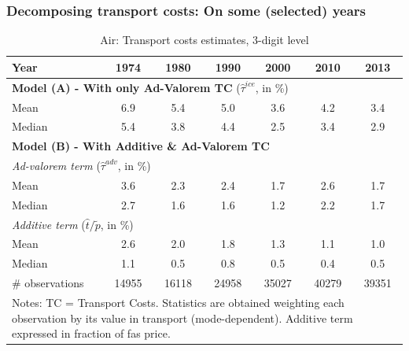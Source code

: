 \documentclass[10 pt,Helvetica, french]{beamer}
\begin{document}
\begin{frame}[label=app_results_summary]
\frametitle{Decomposing transport costs: On some (selected) years}
\footnotesize
\begin{table}[htbp]
  \centering
  \caption{Air: Transport costs estimates, 3-digit level }
\begin{center}
    \begin{tabular}{l|cccccc}
\hline\hline
Year & 1974  & 1980  & 1990  & 2000  & 2010  & 2013   \\
\hline
\multicolumn{7}{l}{\textbf{Model (A) - With only Ad-Valorem TC} ($\widehat{\tau}^{ice}$, in \%)}     \\
\hline
Mean  & 6.9& 5.4 &5.0 & 3.6 & 4.2 & 3.4  \\
Median & 5.4 & 3.8 & 4.4 & 2.5 & 3.4 & 2.9  \\
\hline
\multicolumn{7}{l}{\textbf{Model (B) - With Additive \& Ad-Valorem TC}}    \\
\hline
\multicolumn{7}{l}{\textit{Ad-valorem term} ($\widehat{\tau}^{adv}$, in \%)}  \\ \hline
Mean & 3.6 & 2.3 & 2.4 &1.7 & 2.6 & 1.7  \\
Median & 2.7 & 1.6 & 1.6 & 1.2 & 2.2 & 1.7 \\
\hline
\multicolumn{7}{l}{\textit{Additive term} ($\widehat{t}/\widetilde{p}$, in \%)}     \\ \hline
Mean & 2.6 & 2.0 & 1.8 & 1.3 & 1.1 & 1.0  \\
Median & 1.1 & 0.5 & 0.8 & 0.5 & 0.4 & 0.5  \\
\hline
\# observations & 14955 & 16118 & 24958 & 35027 & 40279 & 39351  \\
\hline\hline
\multicolumn{7}{l}{\parbox[l]{8cm}{ \vspace{7pt}\scriptsize{Notes: TC = Transport Costs. Statistics are obtained weighting each observation by its value in transport (mode-dependent). Additive term expressed in fraction of fas price.}}}
\end{tabular}%
\end{center}
\label{tab:result_air_3d_detail}
\end{table}%
\hyperlink{slide_result1_more}{}
\normalsize
\end{frame}
\end{document}
